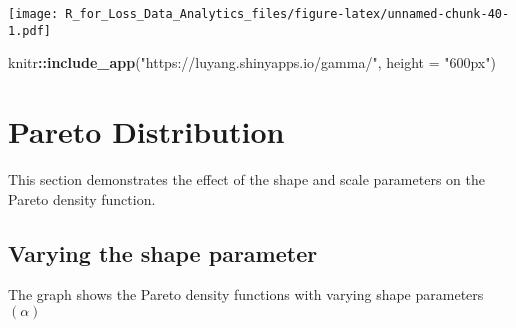 \documentclass[]{book}
\newenvironment{Shaded}{\begin{snugshade}}{\end{snugshade}}
\newcommand{\KeywordTok}[1]{\textcolor[rgb]{0.13,0.29,0.53}{\textbf{#1}}}
\newcommand{\DataTypeTok}[1]{\textcolor[rgb]{0.13,0.29,0.53}{#1}}
\newcommand{\StringTok}[1]{\textcolor[rgb]{0.31,0.60,0.02}{#1}}
\newcommand{\OperatorTok}[1]{\textcolor[rgb]{0.81,0.36,0.00}{\textbf{#1}}}
\newcommand{\NormalTok}[1]{#1}
\theoremstyle{definition}
\theoremstyle{definition}
\theoremstyle{definition}
\theoremstyle{remark}
\begin{document}
\texttt{[image: R\_for\_Loss\_Data\_Analytics\_files/figure-latex/unnamed-chunk-40-1.pdf]}

\begin{Shaded}
\begin{Highlighting}[]
\NormalTok{knitr}\OperatorTok{::}\KeywordTok{include_app}\NormalTok{(}\StringTok{"https://luyang.shinyapps.io/gamma/"}\NormalTok{, }
  \DataTypeTok{height =} \StringTok{"600px"}\NormalTok{)}
\end{Highlighting}
\end{Shaded}

\section{Pareto Distribution}\label{pareto-distribution}

This section demonstrates the effect of the shape and scale parameters
on the Pareto density function.

\subsection{Varying the shape
parameter}\label{varying-the-shape-parameter-1}

The graph shows the Pareto density functions with varying shape
parameters \((\alpha)\)
\end{document}
